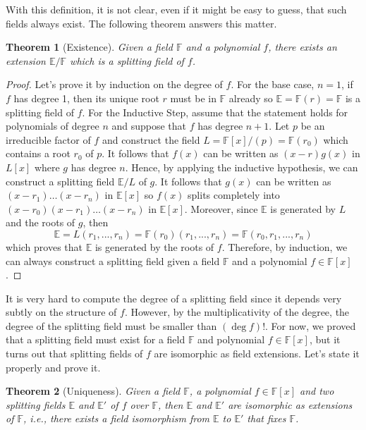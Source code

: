 \documentclass{article}
\theoremstyle{plain}
\newtheorem{theorem}{Theorem}[subsection]
\theoremstyle{definition}
\newcommand{\F}{\mathbb{F}}
\newcommand{\E}{\mathbb{E}}
\begin{document}
With this definition, it is not clear, even if it might be easy to guess, that such fields always exist. The following theorem answers this matter.

\begin{theorem}[Existence]
    Given a field $\F$ and a polynomial $f$, there exists an extension $\E / \F$ which is a splitting field of $f$.
\end{theorem}

\begin{proof}
    Let's prove it by induction on the degree of $f$. For the base case, $n=1$, if $f$ has degree 1, then its unique root $r$ must be in $\F$ already so $\E = \F(r) = \F$ is a splitting field of $f$. For the Inductive Step, assume that the statement holds for polynomials of degree $n$ and suppose that $f$ has degree $n+1$. Let $p$ be an irreducible factor of $f$ and construct the field $L = \F[x]/(p) = \F(r_0)$ which contains a root $r_0$ of $p$. It follows that $f(x)$ can be written as $(x - r)g(x)$ in $L[x]$ where $g$ has degree $n$. Hence, by applying the inductive hypothesis, we can construct a splitting field $\E / L$ of $g$. It follows that $g(x)$ can be written as $(x - r_1) \dots (x - r_n)$ in $\E[x]$ so $f(x)$ splits completely into $(x - r_0)(x - r_1) \dots (x - r_n)$ in $\E[x]$. Moreover, since $\E$ is generated by $L$ and the roots of $g$, then
    $$\E = L(r_1, ..., r_n) = \F(r_0)(r_1, ..., r_n) = \F(r_0, r_1, ..., r_n)$$
    which proves that $\E$ is generated by the roots of $f$. Therefore, by induction, we can always construct a splitting field given a field $\F$ and a polynomial $f \in \F[x]$.
\end{proof}

It is very hard to compute the degree of a splitting field since it depends very subtly on the structure of $f$. However, by the multiplicativity of the degree, the degree of the splitting field must be smaller than $(\deg f)!$. For now, we proved that a splitting field must exist for a field $\F$ and polynomial $f \in \F[x]$, but it turns out that splitting fields of $f$ are isomorphic as field extensions. Let's state it properly and prove it.

\begin{theorem}[Uniqueness]
    Given a field $\F$, a polynomial $f \in \F[x]$ and two splitting fields $\E$ and $\E'$ of $f$ over $\F$, then $\E$ and $\E'$ are isomorphic as extensions of $\F$, i.e., there exists a field isomorphism from $\E$ to $\E'$ that fixes $\F$.
\end{theorem}
\end{document}
